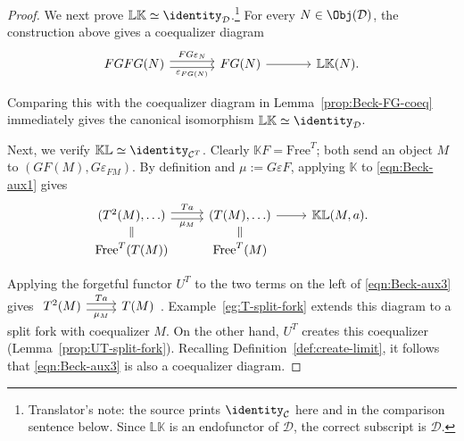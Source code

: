 \begin{proof}
	We next prove
	$\mathbb{L}\mathbb{K}\simeq\identity_{\mathcal{D}}$.\footnote{Translator's
	note: the source prints $\identity_{\mathcal{C}}$ here and in the
	comparison sentence below. Since $\mathbb{L}\mathbb{K}$ is an endofunctor
	of $\mathcal{D}$, the correct subscript is $\mathcal{D}$.} For every
	$N\in\Obj(\mathcal{D})$, the construction above gives a coequalizer
	diagram
	\begin{equation*}\begin{tikzcd}[column sep=large]
		FGFG(N) \arrow[shift left, r, "FG\varepsilon_N"] \arrow[shift right, r, "\varepsilon_{FG(N)}"'] & FG(N) \arrow[r] & \mathbb{L}\mathbb{K}(N).
	\end{tikzcd}\end{equation*}

	Comparing this with the coequalizer diagram in
	Lemma~\ref{prop:Beck-FG-coeq} immediately gives the canonical isomorphism
	$\mathbb{L}\mathbb{K}\simeq\identity_{\mathcal{D}}$.

	Next, we verify
	$\mathbb{K}\mathbb{L}\simeq\identity_{\mathcal{C}^T}$. Clearly
	$\mathbb{K}F=\mathrm{Free}^T$; both send an object $M$ to
	$(GF(M),G\varepsilon_{FM})$. By definition and
	$\mu:=G\varepsilon F$, applying $\mathbb{K}$ to
	\eqref{eqn:Beck-aux1} gives
	\begin{equation}\label{eqn:Beck-aux3}
		\begin{tikzcd}[row sep=small]
			(T^2(M), \ldots) \arrow[shift left, r, "Ta"] \arrow[shift right, r, "\mu_M"'] & (T(M), \ldots) \arrow[r] & \mathbb{K}\mathbb{L}(M, a). \\
			\mathrm{Free}^T(T(M)) \arrow[equal, u] & \mathrm{Free}^T(M) \arrow[equal, u] &
		\end{tikzcd}
	\end{equation}

	Applying the forgetful functor $U^T$ to the two terms on the left of
	\eqref{eqn:Beck-aux3} gives
	$\begin{tikzcd}
		T^2(M) \arrow[shift left, r, "{Ta}"] \arrow[shift right, r, "{\mu_M}"'] & T(M)
	\end{tikzcd}$.
	Example~\ref{eg:T-split-fork} extends this diagram to a split fork with
	coequalizer $M$. On the other hand, $U^T$ creates this coequalizer
	(Lemma~\ref{prop:UT-split-fork}). Recalling
	Definition~\ref{def:create-limit}, it follows that
	\eqref{eqn:Beck-aux3} is also a coequalizer diagram.


\end{proof}
